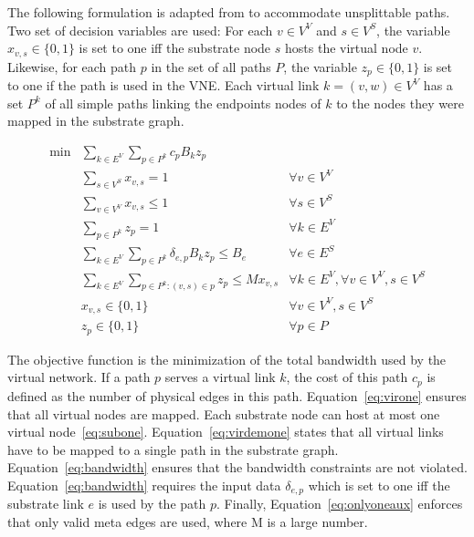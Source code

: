 \documentclass[article]{llncs}
\begin{document}
The following formulation is adapted from \cite{hu:2013} to accommodate unsplittable paths. 
Two set of decision variables are used: For each $v \in V^{V}$ and $s \in V^{S}$, the variable $x_{v,s} \in \{0,1\}$ is set to one iff the substrate node $s$ hosts the virtual node $v$. 
Likewise, for each path $p$ in the set of all paths $P$, the variable $z_{p} \in \{0,1\}$ is set to one if the path is used in the VNE. 
Each virtual link $k=(v,w) \in V^V$ has a set $P^k$ of all simple paths linking the endpoints nodes of $k$ to the nodes they were mapped in the substrate graph.

\begin{align}
  \min  & \sum\limits_{k \in E^{V}}\sum\limits_{p \in P^k}  c_{p} B_k z_{p} \label{eq:obj} \\
        & \sum\limits_{s \in V^{S}} x_{v,s} = 1                                  & \forall v \in V^{V} \label{eq:virone} \\
        & \sum\limits_{v \in V^{V}} x_{v,s} \leq 1                               & \forall s \in V^{S} \label{eq:subone} \\
        & \sum\limits_{p \in P^{k}} z_{p} = 1                                    & \forall k \in E^{V} \label{eq:virdemone} \\
        & \sum\limits_{k \in E^{V}}\sum\limits_{p \in P^{k}} \delta_{e,p} B_{k} z_{p} \leq B_{e} & \forall e \in E^{S} \label{eq:bandwidth} \\
        &  \sum\limits_{k \in E^{V}}\sum\limits_{p \in P^k : (v,s) \in p} z_{p} \leq M x_{v,s} & \forall k \in E^{V}, \forall v \in V^{V}, s \in V^{S} \label{eq:onlyoneaux}\\
        &  x_{v,s} \in \{0,1\}  & \forall v \in V^{V}, s \in V^{S} \nonumber \\
        & z_{p} \in \{0,1\}    & \forall p \in {P} \nonumber
\end{align}

The objective function is the minimization of the total bandwidth used by the virtual network. If a path $p$ serves a virtual link $k$, the cost of this path $c_{p}$ is defined as the number of physical edges in this path.
Equation~\eqref{eq:virone} ensures that all virtual nodes are mapped. Each substrate node can host at most one virtual node~\eqref{eq:subone}.
Equation~\eqref{eq:virdemone} states that all virtual links have to be mapped to a single path in the substrate graph. Equation~\eqref{eq:bandwidth} ensures that the bandwidth constraints are not violated.
Equation~\ref{eq:bandwidth} requires the input data $\delta_{e,p}$ which is set to one iff the substrate link $e$ is used by the path $p$.
Finally, Equation~\eqref{eq:onlyoneaux} enforces that only valid meta edges are used, where M is a large number.
\end{document}
